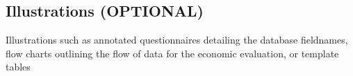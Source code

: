 \subsection{Illustrations (OPTIONAL)}

Illustrations such as annotated questionnaires detailing the database
fieldnames, flow charts outlining the flow of data for the economic
evaluation, or template tables


